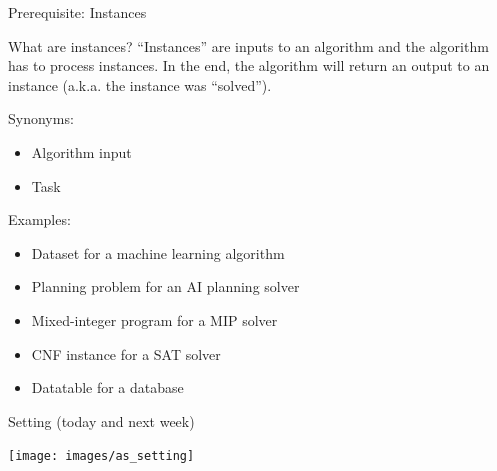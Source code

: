 \begin{frame}[c]{Prerequisite: Instances}

\begin{block}{What are instances?}
``Instances'' are inputs to an algorithm and the algorithm has to process instances.
In the end, the algorithm will return an output to an instance (a.k.a. the instance was ``solved'').
\end{block}

\pause

Synonyms:
\begin{itemize}
  \item Algorithm input
  \item Task
\end{itemize}

\pause

Examples:
\begin{itemize}
  \item Dataset for a machine learning algorithm
  \item Planning problem for an AI planning solver
  \item Mixed-integer program for a MIP solver
  \item CNF instance for a SAT solver
  \item Datatable for a database
\end{itemize}

\end{frame}
\begin{frame}[c]{Setting (today and next week)}

\texttt{[image: images/as\_setting]}

\end{frame}

